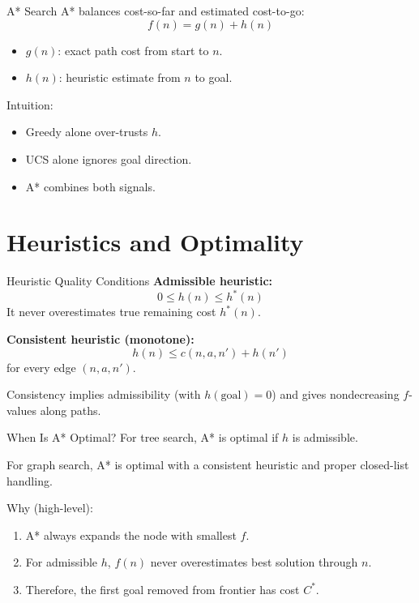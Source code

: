 \documentclass[10pt]{beamer}
\begin{document}
\begin{frame}{A* Search}
    A* balances cost-so-far and estimated cost-to-go:
    \[
        f(n)=g(n)+h(n)
    \]
    \begin{itemize}
        \item $g(n)$: exact path cost from start to $n$.
        \item $h(n)$: heuristic estimate from $n$ to goal.
    \end{itemize}
    \vspace{0.2cm}
    Intuition:
    \begin{itemize}
        \item Greedy alone over-trusts $h$.
        \item UCS alone ignores goal direction.
        \item A* combines both signals.
    \end{itemize}
\end{frame}

\section{Heuristics and Optimality}

\begin{frame}{Heuristic Quality Conditions}
    \textbf{Admissible heuristic:}
    \[
        0 \le h(n) \le h^*(n)
    \]
    It never overestimates true remaining cost $h^*(n)$.

    \vspace{0.25cm}
    \textbf{Consistent heuristic (monotone):}
    \[
        h(n) \le c(n,a,n') + h(n')
    \]
    for every edge $(n,a,n')$.

    \vspace{0.25cm}
    Consistency implies admissibility (with $h(\text{goal})=0$) and gives nondecreasing $f$-values along paths.
\end{frame}

\begin{frame}{When Is A* Optimal?}
    For tree search, A* is optimal if $h$ is admissible.

    \vspace{0.25cm}
    For graph search, A* is optimal with a consistent heuristic and proper closed-list handling.

    \vspace{0.25cm}
    Why (high-level):
    \begin{enumerate}
        \item A* always expands the node with smallest $f$.
        \item For admissible $h$, $f(n)$ never overestimates best solution through $n$.
        \item Therefore, the first goal removed from frontier has cost $C^*$.
    \end{enumerate}
\end{frame}
\end{document}
